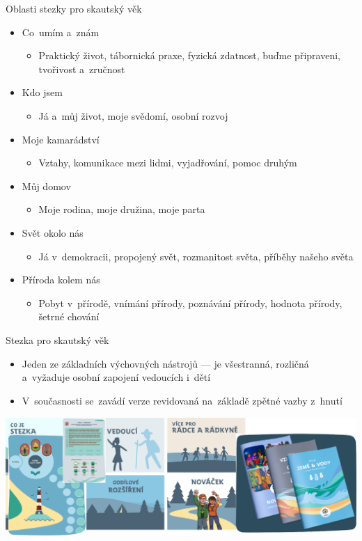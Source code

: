 \documentclass[compress, ucs, xelatex, 11pt, xcolor=dvipsnames, print, aspectratio=169,
	hyperref={
		bookmarks=true,
		unicode=true,
		colorlinks=true,
		pdftitle={Skautska vychovna metoda},
		plainpages=false,
		pdfauthor={Vojtech Zeisek},
		pdfsubject={Skautska vychovna metoda a jeji vyvoj za posledni stoleti a desetileti},
		pdfcreator={XeLaTeX},
		pdfkeywords={Junak, Pedagogika, Skaut, Skauting, Vychovna metoda},
		linkcolor=Red, %
		anchorcolor=ForestGreen, %
		citecolor=ForestGreen, %
		filecolor=ForestGreen, %
		menucolor=ForestGreen, %
		urlcolor=Sepia, %
		pdftex},
	url={hyphens, lowtilde} %
	]{beamer}
\begin{document}
\begin{frame}{Oblasti stezky pro skautský věk}
	\begin{itemize}
		\item Co~umím a~znám
		\begin{itemize}
			\item Praktický život, tábornická praxe, fyzická zdatnost, buďme připraveni, tvořivost a~zručnost
		\end{itemize}
		\item Kdo jsem
		\begin{itemize}
			\item Já a~můj život, moje svědomí, osobní rozvoj
		\end{itemize}
		\item Moje kamarádství
		\begin{itemize}
			\item Vztahy, komunikace mezi lidmi, vyjadřování, pomoc druhým
		\end{itemize}
		\item Můj domov
		\begin{itemize}
			\item Moje rodina, moje družina, moje parta
		\end{itemize}
		\item Svět okolo nás
		\begin{itemize}
			\item Já v~demokracii, propojený svět, rozmanitost světa, příběhy našeho světa
		\end{itemize}
		\item Příroda kolem nás
		\begin{itemize}
			\item Pobyt v~přírodě, vnímání přírody, poznávání přírody, hodnota přírody, šetrné chování
		\end{itemize}
	\end{itemize}
\end{frame}

\begin{frame}{Stezka pro skautský věk}
	\begin{itemize}
		\item Jeden ze základních výchovných nástrojů --- je všestranná, rozličná a~vyžaduje osobní zapojení vedoucích i~dětí
		\item V~současnosti se~zavádí verze revidovaná na~základě zpětné vazby z~hnutí
	\end{itemize}
	\begin{center}
		\includegraphics[height=4.5cm]{stezka.png}
	\end{center}
\end{frame}
\end{document}
